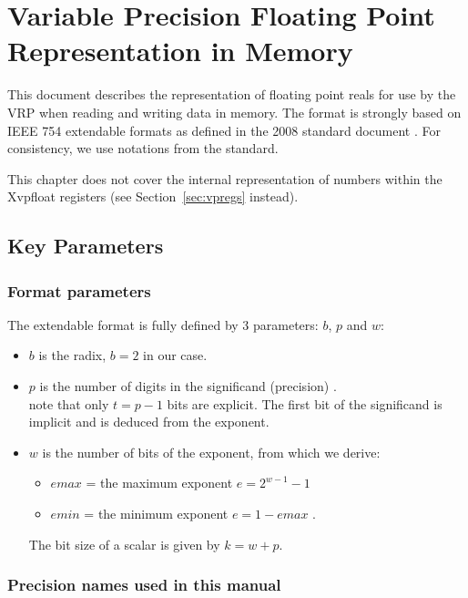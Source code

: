 \chapter{Variable Precision Floating Point Representation in Memory}
\label{sec:mem_format}

This document describes the representation of floating point reals for use by the VRP when reading and writing data in memory.
The format is strongly based on IEEE 754 extendable formats as defined in the 2008 standard document \cite{IEEE754}.
For consistency, we use notations from the standard.

This chapter does not cover the internal representation of numbers within the Xvpfloat registers (see Section~\ref{sec:vpregs} instead).

\section{Key Parameters}

\subsection{Format parameters}
The extendable format is fully defined by 3 parameters: $b$, $p$ and $w$:
\begin{itemize}[topsep=0pt]
\item $b$ is the radix, $b=2$ in our case.
\item $p$ is the number of digits in the significand (precision) . \\
  note that only $t=p-1$ bits are explicit. The first bit of the significand is implicit and is deduced from the exponent.
\item $w$ is the number of bits of the exponent, from which we derive:
  \begin{itemize}[topsep=0pt]
  \item[$\bullet$]  $emax$ = the maximum exponent $e=2^{{w-1}}-1$
  \item[$\bullet$]  $emin$ = the minimum exponent $e=1-emax$ .
  \end{itemize}
The bit size of a scalar is given by $k=w+p$.
\end{itemize}

\subsection{Precision names used in this manual}
\label{sec:precision_names}

